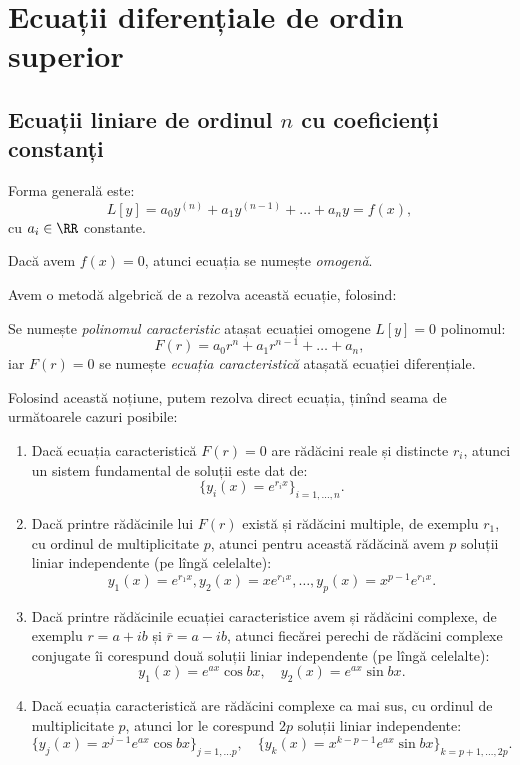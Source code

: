 \chapter{Ecuații diferențiale de ordin superior}


\section{Ecuații liniare de ordinul $n$ cu coeficienți constanți}

Forma generală este:
\[
  L[y] = a_0 y^{(n)} + a_1 y^{(n-1)} + \dots + a_n y = f(x),
\]
cu $a_i \in \RR$ constante.

Dacă avem $f(x) = 0$, atunci ecuația se numește \emph{omogenă}.

Avem o metodă algebrică de a rezolva această ecuație, folosind:

\begin{definition}\label{def:pol-car-ec}
  Se numește \emph{polinomul caracteristic} atașat ecuației omogene $L[y] = 0$
  polinomul:
  \[
    F(r) = a_0 r^n + a_1 r^{n-1} + \dots + a_n,
  \]
  iar $F(r) = 0$ se numește \emph{ecuația caracteristică} atașată ecuației diferențiale.
\end{definition}

Folosind această noțiune, putem rezolva direct ecuația, ținînd seama de următoarele
cazuri posibile:

\begin{theorem}\label{thm:ec-car-dif}
  \begin{enumerate}[(1)]
  \item Dacă ecuația caracteristică $F(r) = 0$ are rădăcini reale și distincte $r_i$,
    atunci un sistem fundamental de soluții este dat de:
    \[
      \big\{ y_i(x) = e^{r_i x} \big\}_{i=1,\dots,n}.
    \]
  \item Dacă printre rădăcinile lui $F(r)$ există și rădăcini multiple, de exemplu
    $r_1$, cu ordinul de multiplicitate $p$, atunci pentru această rădăcină avem
    $p$ soluții liniar independente (pe lîngă celelalte):
    \[
      y_1(x) = e^{r_1 x}, y_2(x) = xe^{r_1 x}, \dots, y_p(x) = x^{p-1} e^{r_1 x}.
    \]
  \item Dacă printre rădăcinile ecuației caracteristice avem și rădăcini complexe,
    de exemplu $r = a + ib$ și $\overline{r} = a - ib$, atunci fiecărei perechi
    de rădăcini complexe conjugate îi corespund două soluții liniar independente
    (pe lîngă celelalte):
    \[
      y_1(x) = e^{ax} \cos bx, \quad y_2(x) = e^{ax} \sin bx.
    \]
  \item Dacă ecuația caracteristică are rădăcini complexe ca mai sus, cu ordinul
    de multiplicitate $p$, atunci lor le corespund $2p$ soluții liniar independente:
    \[
      \big\{ y_j(x) = x^{j-1} e^{ax} \cos bx \big\}_{j=1, \dots p}, \quad
      \big\{ y_k(x) = x^{k-p-1} e^{ax} \sin bx\big\}_{k=p+1, \dots, 2p}.
    \]
  \end{enumerate}
\end{theorem}


